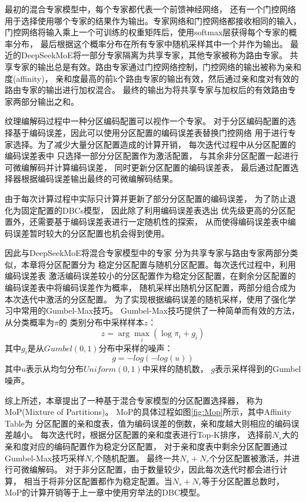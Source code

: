 最初的混合专家模型中，每个专家都代表一个前馈神经网络，
还有一个门控网络用于选择使用哪个专家的结果作为输出。专家网络和门控网络都接收相同的输入，
门控网络将输入乘上一个可训练的权重矩阵后，使用softmax层获得每个专家的概率分布，
最后根据这个概率分布在所有专家中随机采样其中一个并作为输出。
最近的DeepSeekMoE\cite{dai2024deepseekmoe}将一部分专家隔离为共享专家，其他专家被称为路由专家。
共享专家的输出总是有效。路由专家通过门控网络控制，门控网络的输出被称为亲和度(affinity)，
亲和度最高的前k个路由专家的输出有效，然后通过亲和度对有效的路由专家的输出进行加权混合。
最终的输出为将共享专家与加权后的有效路由专家两部分输出之和。

纹理编解码过程中一种分区编码配置可以视作一个专家。
对于分区编码配置的选择基于编码误差，因此可以使用分区配置的编码误差表替换门控网络
用于进行专家选择。为了减少大量分区配置造成的计算开销，
每次迭代过程中从分区配置的编码误差表中
只选择一部分分区配置作为激活配置，
与其余非分区配置一起进行可微编解码并计算编码误差，
同时更新分区配置的编码误差表，
最后通过配置选择器根据编码误差输出最终的可微编解码结果。

由于每次计算过程中实际只计算并更新了部分分区配置的编码误差，
为了防止退化为固定配置的DBCs模型，
因此除了利用编码误差表选出
优先级更高的分区配置外，还需要基于编码误差表进行一定随机性的探索，
从而使得编码误差表中编码误差暂时较大的分区配置也机会得到使用。

因此与DeepSeekMoE\cite{dai2024deepseekmoe}将混合专家模型中的专家
分为共享专家与路由专家两部分类似，本章将分区配置分为
稳定分区配置与随机分区配置。每次迭代过程中，利用编码误差表
激活编码误差较小的分区配置作为稳定分区配置，在剩余分区配置的编码误差表中将编码误差作为概率，
随机采样出随机分区配置，两部分组合成为本次迭代中激活的分区配置。
为了实现根据编码误差的随机采样，使用了强化学习中常用的Gumbel-Max技巧\cite{jang2016categorical}。
Gumbel-Max技巧提供了一种简单而有效的方法，从分类概率为$\pi$的
类别分布中采样样本$z$：
\begin{equation}
z = \arg\max_i \left( \log\pi_i + g_i \right)
\end{equation}
其中$g_i$是从$Gumbel(0, 1)$分布中采样的噪声：
\begin{equation}
    g = -log(-log(u))
\end{equation}
其中$u$表示从均匀分布$Uniform(0, 1)$中采样的随机数，
$g$表示采样得到的Gumbel噪声。

综上所述，本章提出了一种基于混合专家模型的分区配置选择器，
称为MoP(Mixture of Partitions)。
MoP的具体过程如图\ref{fig:Mop}所示，其中Affinity Table为
分区配置的亲和度表，值为编码误差的倒数，亲和度越大则相应的编码误差越小。
每次迭代时，根据分区配置的亲和度表进行Top-K排序，
选择前$N_s$大的亲和度对应的编码配置作为稳定分区配置，
对于亲和度表中剩余分区配置通过Gumbel-Max技巧采样$N_r$个随机配置。
最终一共$N_s+N_r$个分区配置被激活，并进行可微编解码。
对于非分区配置，由于数量较少，因此每次迭代时都会进行计算，
相当于将非分区配置都作为稳定配置。当$N_s+N_r$等于分区配置总数时，
MoP的计算开销等于上一章中使用穷举法的DBC模型。

